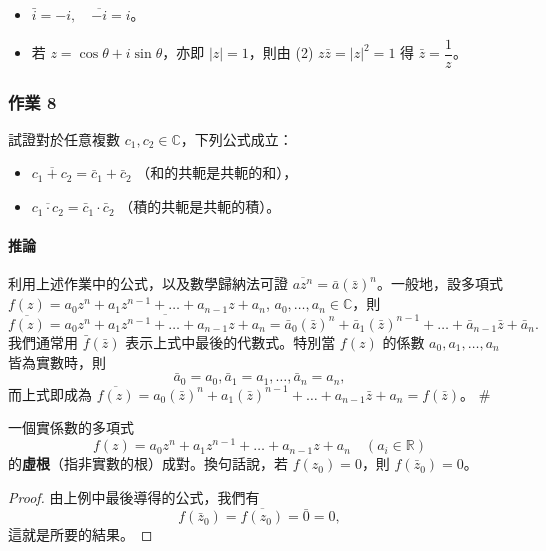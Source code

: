 \begin{example}
\begin{itemize}
  \item[(i)] $\bar{i} = -i, \quad \overline{-i} = i$。
  \item[(ii)] 若 $z=\cos\theta+i\sin\theta$，亦即 $|z|=1$，則由 (2) $z\bar{z}=|z|^2=1$ 得 $\bar{z} = \dfrac{1}{z}$。 \qedhere
\end{itemize}
\end{example}

\subsubsection*{作業 8}
試證對於任意複數 $c_1, c_2 \in \mathbb{C}$，下列公式成立：
\begin{itemize}
  \item[(i)] $\overline{c_1+c_2} = \bar{c}_1+\bar{c}_2$ （和的共軛是共軛的和），
  \item[(ii)] $\overline{c_1\cdot c_2} = \bar{c}_1\cdot\bar{c}_2$ （積的共軛是共軛的積）。
\end{itemize}


\paragraph{推論} 利用上述作業中的公式，以及數學歸納法可證 $\overline{a z^n} = \bar{a}(\bar{z})^n$。一般地，設多項式 $f(z) = a_0 z^n + a_1 z^{n-1} + \dots + a_{n-1} z + a_n$, $a_0, \dots, a_n \in \mathbb{C}$，則
\[
\overline{f(z)} = \overline{a_0 z^n + a_1 z^{n-1} + \dots + a_{n-1} z + a_n} = \bar{a}_0(\bar{z})^n + \bar{a}_1(\bar{z})^{n-1} + \dots + \bar{a}_{n-1}\bar{z} + \bar{a}_n.
\]
我們通常用 $\bar{f}(\bar{z})$ 表示上式中最後的代數式。特別當 $f(z)$ 的係數 $a_0, a_1, \dots, a_n$ 皆為實數時，則
\[
\bar{a}_0=a_0, \bar{a}_1=a_1, \dots, \bar{a}_n=a_n,
\]
而上式即成為 $\overline{f(z)} = a_0(\bar{z})^n + a_1(\bar{z})^{n-1} + \dots + a_{n-1}\bar{z}+a_n = f(\bar{z})$。 \hfill\#

\begin{discussion}
一個實係數的多項式
\[
f(z) = a_0 z^n + a_1 z^{n-1} + \dots + a_{n-1} z + a_n \quad (a_i \in \mathbb{R})
\]
的\textbf{虛根}（指非實數的根）成對。換句話說，若 $f(z_0)=0$，則 $f(\bar{z}_0)=0$。
\end{discussion}

\begin{proof}
由上例中最後導得的公式，我們有
\[
f(\bar{z}_0) = \overline{f(z_0)} = \bar{0} = 0,
\]
這就是所要的結果。
\end{proof}

